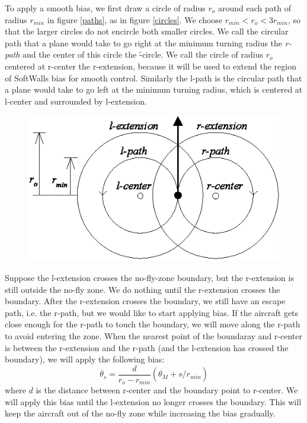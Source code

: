 \documentclass[11pt]{article}
\begin{document}
To apply a smooth bias, we first draw a circle of radius $r_{o}$
around each path of radius $r_{min}$ in figure \ref{paths}, as in
figure \ref{circles}.  We choose $r_{min} < r_{o} < 3r_{min}$, so that
the larger circles do not encircle both smaller circles.  We call the
circular path that a plane would take to go right at the minimum
turning radius the \textit{r-path} and the center of this circle the
\r-circle.  We call the circle of radius $r_{o}$ centered at r-center
the r-extension, because it will be used to extend the region of
SoftWalls bias for smooth control.  Similarly the l-path is the
circular path that a plane would take to go left at the minimum
turning radius, which is centered at l-center and surrounded by
l-extension.


\begin{figure}[btp]
\centering
\includegraphics[width=5in]{circles.eps}
\end{figure}


Suppose the l-extension crosses the no-fly-zone boundary, but the
r-extension is still outside the no-fly zone.  We do nothing until the
r-extension crosses the boundary.  After the r-extension crosses the
boundary, we still have an escape path, i.e. the r-path, but we would
like to start applying bias.  If the aircraft gets close enough for
the r-path to touch the boundary, we will move along the r-path to
avoid entering the zone.  When the nearest point of the boundaray and
r-center is between the r-extension and the r-path (and the l-extension
has crossed the boundary), we will apply the following bias:
\[
\dot{\theta_{s}} = \frac{d}{r_{o} - r_{min}} (\dot{\theta_{M}} + s/r_{min})
\]
where $d$ is the distance between r-center and the boundary point to
r-center.  We will apply this bias until the l-extension no longer
crosses the boundary.  This will keep the aircraft out of the no-fly
zone while increasing the bias gradually.
\end{document}
